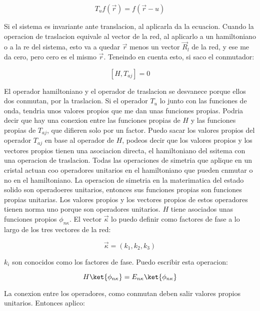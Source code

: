 \documentclass[11pt,fleqn]{book}
\begin{document}
\begin{equation}
    T_{u}f(\vec{r})=f(\vec{r}-u)
\end{equation}

Si el sistema es invariante ante translacion, al aplicarla da la ecuacion. Cuando la operacion de traslacion equivale al vector de la red, al aplicarlo a un hamiltoniano o a la re del sistema, esto va a quedar $\vec{r}$ menos un vector $\vec{R}_{l}$ de la red, y ese me da cero, pero cero es el mismo $\vec{r}$. Teneindo en cuenta esto, si saco el conmutador:

\begin{equation}
    \left[H,T_{aj}\right]=0
\end{equation}

El operador hamiltoniano y el operador de traslacion se desvanece porque ellos dos conmutan, por la traslacion. Si el operador $T_{u}$ lo junto con las funciones de onda, tendria unos valores propios que me dan unas funciones propias. Podria decir que hay una conexion entre las funciones propias de $H$ y las funciones propias de $T_{aj}$, que difieren solo por un factor. Puedo sacar los valores propios del operador $T_{aj}$ en base al operador de $H$, podeos decir  que los valores propios y los vectores propios tienen una  asociacion  directa, el hamiltoniano del ssitema con una operacion de traslacion. Todas las operaciones de simetria que aplique en un cristal actuan coo operadores unitarios en el hamiltoniano que pueden cnmutar o no en el hamiltoniano. La operacion de simetria en la materimatica del estado solido son operadoeres unitarios, entonces sus funciones propias son funciones propias unitarias. Los valores propios y los vectores propios de estos operadores tienen norma uno porque son operadores unitarios. $H$ tiene asociados unas funciones propios $\phi_{n\kappa}$. El vector  $\vec{\kappa}$ lo puedo definir como factores de fase a lo largo de los tres vectores  de la red:

\begin{equation}
    \vec{\kappa}=(k_{1}, k_{2}, k_{3})
\end{equation}          

$k_{i}$ son conocidos como los factores de fase. Puedo escribir esta operacion:

\begin{equation}
    H\ket{\phi_{n\kappa}}=E_{n\kappa}\ket{\phi_{n\kappa}}
\end{equation}

La conexion entre los operadores, como conmutan deben salir valores propios unitarios. Entonces aplico:
\end{document}
